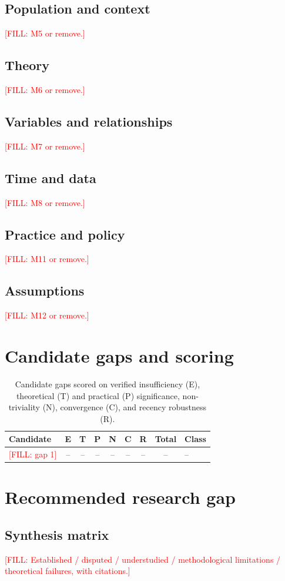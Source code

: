 \documentclass[11pt]{article}
\newcommand{\fillin}[1]{\textcolor{red}{[FILL: #1]}}
\begin{document}
\subsection{Population and context}\fillin{M5 or remove.}
\subsection{Theory}\fillin{M6 or remove.}
\subsection{Variables and relationships}\fillin{M7 or remove.}
\subsection{Time and data}\fillin{M8 or remove.}
\subsection{Practice and policy}\fillin{M11 or remove.}
\subsection{Assumptions}\fillin{M12 or remove.}

\section{Candidate gaps and scoring}
\begin{table}[htbp]
\centering
\small
\caption{Candidate gaps scored on verified insufficiency (E), theoretical (T) and practical (P) significance, non-triviality (N), convergence (C), and recency robustness (R).}
\label{tab:scores}
\begin{tabular}{@{}p{5.2cm}cccccccl@{}}
\toprule
Candidate & E & T & P & N & C & R & Total & Class \\
\midrule
\fillin{gap 1} & -- & -- & -- & -- & -- & -- & -- & -- \\
\bottomrule
\end{tabular}
\end{table}

\section{Recommended research gap}
\subsection{Synthesis matrix}
\fillin{Established / disputed / understudied / methodological limitations / theoretical failures, with citations.}
\end{document}
